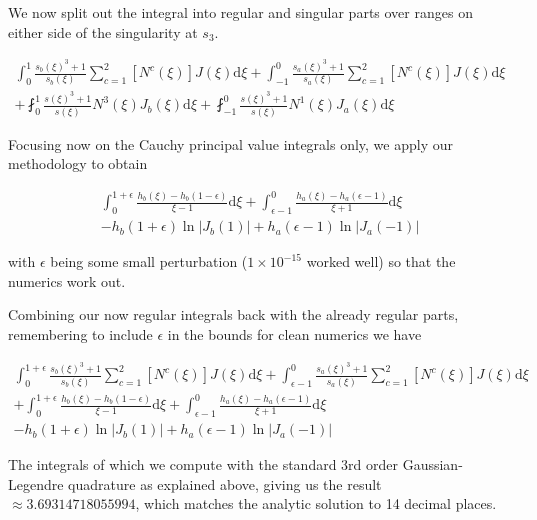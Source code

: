 We now split out the integral into regular and singular parts over ranges on either side of the singularity at $s_3$.

\begin{equation}
\begin{split}
\int_{0}^{1} \frac{s_b(\xi)^3+1}{s_b(\xi)} \sum^{2}_{c=1} \left[ N^c(\xi) \right] J(\xi) \mathrm{d}\xi
+ \int_{-1}^{0} \frac{s_a(\xi)^3+1}{s_a(\xi)} \sum^{2}_{c=1} \left[ N^c(\xi) \right] J(\xi) \mathrm{d}\xi\\
+ \fint_{0}^{1} \frac{s(\xi)^3+1}{s(\xi)} N^3(\xi) J_b(\xi) \mathrm{d}\xi
+ \fint_{-1}^{0} \frac{s(\xi)^3+1}{s(\xi)} N^1(\xi) J_a(\xi) \mathrm{d}\xi
\end{split}
\end{equation}

Focusing now on the Cauchy principal value integrals only, we apply our methodology to obtain

\begin{equation}
\begin{split}
\int_{0}^{1+\epsilon} \frac{h_b(\xi)-h_b(1-\epsilon)}{\xi-1} \mathrm{d}\xi
+ \int_{\epsilon-1}^{0} \frac{h_a(\xi)-h_a(\epsilon-1)}{\xi+1} \mathrm{d}\xi\\
- h_b(1+\epsilon) \ln \big|J_b(1)\big| + h_a(\epsilon-1) \ln \big|J_a(-1)\big|
\end{split}
\end{equation}

with $\epsilon$ being some small perturbation ($1\times 10^{-15}$ worked well) so that the numerics work out.

Combining our now regular integrals back with the already regular parts, remembering to include $\epsilon$ in the bounds for clean numerics we have

\begin{equation}
\begin{split}
\int_{0}^{1+\epsilon} \frac{s_b(\xi)^3+1}{s_b(\xi)} \sum^{2}_{c=1} \left[ N^c(\xi) \right] J(\xi) \mathrm{d}\xi
+ \int_{\epsilon-1}^{0} \frac{s_a(\xi)^3+1}{s_a(\xi)} \sum^{2}_{c=1} \left[ N^c(\xi) \right] J(\xi) \mathrm{d}\xi\\
+ \int_{0}^{1+\epsilon} \frac{h_b(\xi)-h_b(1-\epsilon)}{\xi-1} \mathrm{d}\xi
+ \int_{\epsilon-1}^{0} \frac{h_a(\xi)-h_a(\epsilon-1)}{\xi+1} \mathrm{d}\xi\\
- h_b(1+\epsilon) \ln \big|J_b(1)\big| + h_a(\epsilon-1) \ln \big|J_a(-1)\big|
\end{split}
\end{equation}

The integrals of which we compute with the standard 3rd order Gaussian-Legendre quadrature as explained above, giving us the result $\approx 3.69314718055994$, which matches the analytic solution to 14 decimal places.





  
 {}

 
